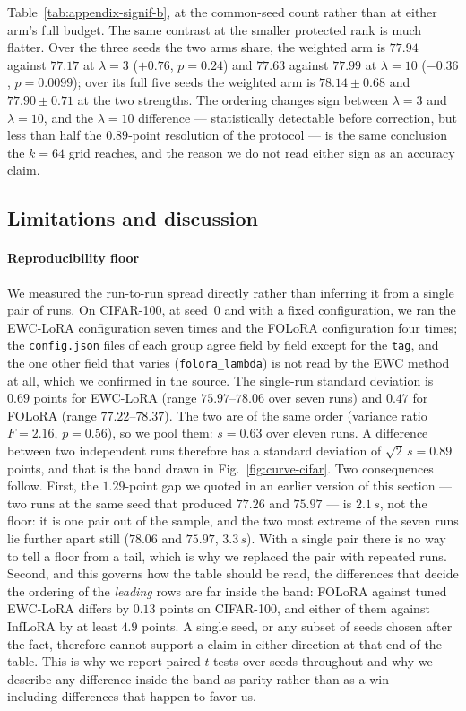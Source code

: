 Table~\ref{tab:appendix-signif-b}, at the common-seed count rather than at either arm's
full budget. The same contrast at the smaller protected rank is much flatter. Over the three
seeds the two arms share, the weighted arm is $77.94$ against $77.17$ at $\lambda=3$
($+0.76$, $p=0.24$) and $77.63$ against $77.99$ at $\lambda=10$ ($-0.36$, $p=0.0099$); over
its full five seeds the weighted arm is $78.14\pm0.68$ and $77.90\pm0.71$ at the two
strengths. The ordering changes sign between $\lambda=3$ and $\lambda=10$, and the
$\lambda=10$ difference --- statistically detectable before correction, but less than half
the $0.89$-point resolution of the protocol --- is the same conclusion the $k{=}64$ grid
reaches, and the reason we do not read either sign as an accuracy claim.

\subsection{Limitations and discussion}
\label{sec:discussion}

\paragraph{Reproducibility floor}
We measured the run-to-run spread directly rather than inferring it from a single pair of
runs. On CIFAR-100, at seed~0 and with a fixed configuration, we ran the EWC-LoRA
configuration seven times and the FOLoRA configuration four times; the \texttt{config.json}
files of each group agree field by field except for the \texttt{tag}, and the one other
field that varies (\texttt{folora\_lambda}) is not read by the EWC method at all, which we
confirmed in the source. The single-run standard deviation is $0.69$ points for EWC-LoRA
(range $75.97$--$78.06$ over seven runs) and $0.47$ for FOLoRA (range $77.22$--$78.37$).
The two are of the same order (variance ratio $F{=}2.16$, $p{=}0.56$), so we pool them:
$s{=}0.63$ over eleven runs. A difference between two independent runs therefore has a
standard deviation of $\sqrt{2}\,s = 0.89$ points, and that is the band drawn in
Fig.~\ref{fig:curve-cifar}.
Two consequences follow. First, the $1.29$-point gap we quoted in an earlier version of this
section --- two runs at the same seed that produced $77.26$ and $75.97$ --- is $2.1\,s$, not the
floor: it is one pair out of the sample, and the two most extreme of the seven runs lie further
apart still ($78.06$ and $75.97$, $3.3\,s$). With a single pair there is no way to tell a floor
from a tail, which is why we replaced the pair with repeated runs. Second, and this governs how the table should be read, the differences
that decide the ordering of the \emph{leading} rows are far inside the band: FOLoRA against
tuned EWC-LoRA differs by $0.13$ points on CIFAR-100, and either of them against InfLoRA by
at least $4.9$ points. A single seed, or any subset of seeds chosen after the fact, therefore
cannot support a claim in either direction at that end of the table. This is why we report
paired $t$-tests over seeds throughout and why we describe any difference inside the band as
parity rather than as a win --- including differences that happen to favor us.

